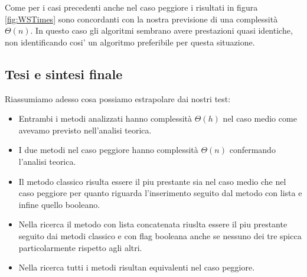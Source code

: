 Come per i casi precedenti anche nel caso peggiore i risultati in figura \ref{fig:WSTimes} sono concordanti con la nostra previsione di una complessità $\Theta(n)$.
In questo caso gli algoritmi sembrano avere prestazioni quasi identiche, non identificando cosi' un algoritmo preferibile per questa situazione.


\subsection{Tesi e sintesi finale}
\label{TesiSintesiFinale_1}
Riassumiamo adesso cosa possiamo estrapolare dai nostri test:
\begin{itemize}
    \item Entrambi i metodi analizzati hanno complessità $\Theta(h)$ nel caso medio come avevamo previsto nell'analisi teorica.
    \item I due metodi nel caso peggiore hanno complessità $\Theta(n)$ confermando l'analisi teorica.
    \item Il metodo classico risulta essere il piu prestante sia nel caso medio che nel caso peggiore per quanto riguarda l'inserimento seguito dal metodo con lista e infine quello booleano.
    \item Nella ricerca il metodo con lista concatenata riuslta essere il piu prestante seguito dai metodi classico e con flag booleana anche se nessuno dei tre spicca particolarmente rispetto agli altri.
    \item Nella ricerca tutti i metodi risultan equivalenti nel caso peggiore.
\end{itemize}



